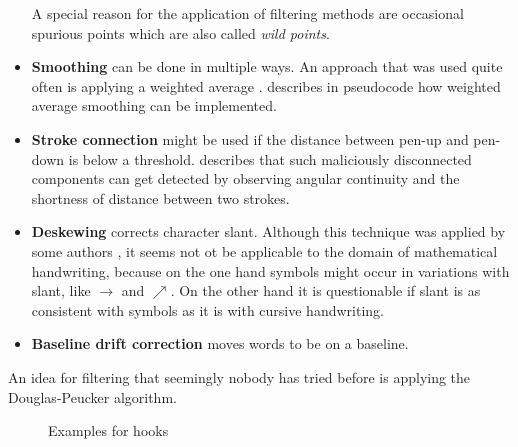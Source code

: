 \begin{itemize}
          A special reason for the application of filtering methods are occasional spurious points which are also called \textit{wild points}.
    \item \textbf{Smoothing} can be done in multiple ways. An approach that was
          used quite often is applying a weighted average
          \cite{Groner66,Division87,Arakaw83}. 
          describes in pseudocode how weighted average smoothing can be implemented.
    \item \textbf{Stroke connection} might be used if the distance between
          pen-up and pen-down is below a threshold. \cite{Guerfali93} describes
          that such maliciously disconnected components can get detected by
          observing angular continuity and the shortness of distance between
          two strokes.
    \item \textbf{Deskewing} corrects character slant. Although this technique
          was applied by some authors \cite{Bozinovic1989,Guerfali93,IWFHR94},
          it seems not ot be
          applicable to the domain of mathematical handwriting, because on the
          one hand symbols might occur in variations with slant, like
          $\rightarrow$ and $\nearrow$. On the other hand it is questionable
          if slant is as consistent with symbols as it is with cursive
          handwriting.
    \item \textbf{Baseline drift correction} moves words to be on a baseline.
\end{itemize}

An idea for filtering that seemingly nobody has tried before is applying the
Douglas-Peucker algorithm.

\begin{figure}[ht]
    \centering
    \caption{Examples for hooks}
    \label{fig:hooks}
\end{figure}

